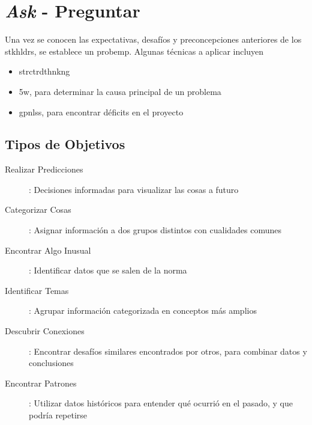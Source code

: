 \section{\textit{Ask} - Preguntar}
Una vez se conocen las expectativas, desafíos y preconcepciones anteriores de los \gls{stkhldrs}, se establece un \gls{probemp}. Algunas técnicas a aplicar incluyen
\begin{itemize}
    \item {\gls{strctrdthnkng}}
    \item {\gls{5w}, para determinar la causa principal de un problema}
    \item {\gls{gpnlss}, para encontrar déficits en el proyecto}
\end{itemize}

\subsection{Tipos de Objetivos}
\begin{description}
    \item [Realizar Predicciones]{ : Decisiones informadas para visualizar las cosas a futuro}
    \item [Categorizar Cosas]{ : Asignar información a dos grupos distintos con cualidades comunes}
    \item [Encontrar Algo Inusual]{ : Identificar datos que se salen de la norma}
    \item [Identificar Temas]{ : Agrupar información categorizada en conceptos más amplios}
    \item [Descubrir Conexiones]{ : Encontrar desafíos similares encontrados por otros, para combinar datos y conclusiones}
    \item [Encontrar Patrones]{ : Utilizar datos históricos para entender qué ocurrió en el pasado, y que podría repetirse}
\end{description}


